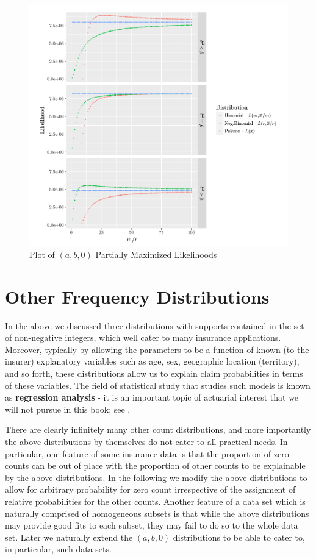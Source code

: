 \documentclass[]{book}
\theoremstyle{definition}
\theoremstyle{definition}
\theoremstyle{definition}
\theoremstyle{remark}
\begin{document}
\begin{figure}

{\centering \includegraphics[width=0.8\linewidth]{Figures/figure2.3} 

}

\caption{Plot of $(a,b,0)$ Partially Maximized Likelihoods}\label{fig:MLEab0}
\end{figure}

\section{Other Frequency
Distributions}\label{S:other-frequency-distributions}

In the above we discussed three distributions with supports contained in
the set of non-negative integers, which well cater to many insurance
applications. Moreover, typically by allowing the parameters to be a
function of known (to the insurer) explanatory variables such as age,
sex, geographic location (territory), and so forth, these distributions
allow us to explain claim probabilities in terms of these variables. The
field of statistical study that studies such models is known as
\textbf{regression analysis} - it is an important topic of actuarial
interest that we will not pursue in this book; see
\citep{freesregression}.

There are clearly infinitely many other count distributions, and more
importantly the above distributions by themselves do not cater to all
practical needs. In particular, one feature of some insurance data is
that the proportion of zero counts can be out of place with the
proportion of other counts to be explainable by the above distributions.
In the following we modify the above distributions to allow for
arbitrary probability for zero count irrespective of the assignment of
relative probabilities for the other counts. Another feature of a data
set which is naturally comprised of homogeneous subsets is that while
the above distributions may provide good fits to each subset, they may
fail to do so to the whole data set. Later we naturally extend the
\((a,b,0)\) distributions to be able to cater to, in particular, such
data sets.
\end{document}
